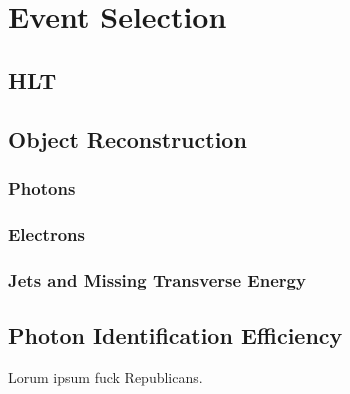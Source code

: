 \documentclass[dissertation.tex]{subfiles}
\begin{document}
\chapter{Event Selection}
\label{chap:Event Selection}

\section{HLT}

\section{Object Reconstruction}
\subsection{Photons}
\subsection{Electrons}
\subsection{Jets and Missing Transverse Energy}
\label{sec:Jets and Missing Transverse Energy}

\section{Photon Identification Efficiency}

Lorum ipsum fuck Republicans.
\end{document}
